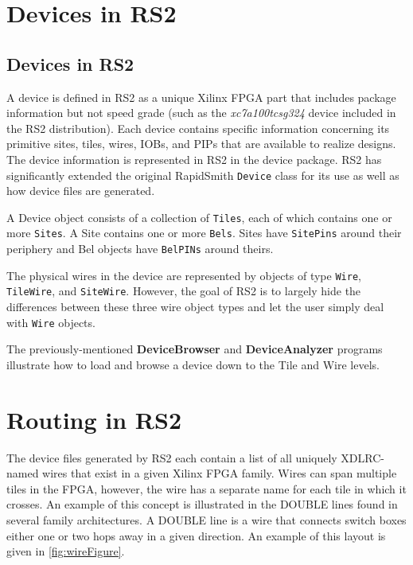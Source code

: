 \documentclass[12pt]{article}
\newcommand{\cls}[1]{{\texttt{#1}}}
\newcommand{\pgm}[1]{{\textbf{#1}}}
\begin{document}
\section{Devices in RS2}

\subsection{Devices in RS2}
A device is defined in RS2 as a unique Xilinx FPGA part that includes package
information but not speed grade (such as the {\em xc7a100tcsg324} device
included in the RS2 distribution).  Each device contains specific information concerning its
primitive sites, tiles, wires, IOBs, and PIPs that are available to realize
designs.  The device information is represented in RS2 in the device package. 
RS2 has significantly extended the original RapidSmith \cls{Device} class for
its use as well as how device files are generated.

A Device object consists of a collection of \cls{Tiles}, each of which contains
one or more \cls{Sites}.  A Site contains one or more \cls{Bels}.  Sites have
\cls{SitePins} around their periphery and Bel objects have \cls{BelPINs} around
theirs.

The physical wires in the device are represented by objects of type \cls{Wire},
\cls{TileWire}, and \cls{SiteWire}.  However, the goal of RS2 is to largely hide
the differences between these three wire object types and let the user simply deal
with \cls{Wire} objects.

The previously-mentioned \pgm{DeviceBrowser} and \pgm{DeviceAnalyzer} programs
illustrate how to load and browse a device down to the Tile and Wire levels.

\section{Routing in RS2}
The device files generated by RS2 each contain a list of all uniquely
XDLRC-named wires that exist in a given Xilinx FPGA family.  Wires can span
multiple tiles in the FPGA, however, the wire has a separate name for each tile
in which it crosses.  An example of this concept is illustrated in the DOUBLE
lines found in several family architectures.  A DOUBLE line is a wire that
connects switch boxes either one or two hops away in a given direction.  An
example of this layout is given in \autoref{fig:wireFigure}.
\end{document}
